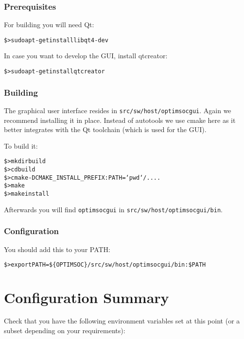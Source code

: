 \subsubsection{Prerequisites}

For building you will need Qt:

\begin{alltt}
\$> sudo apt-get install libqt4-dev
\end{alltt}

In case you want to develop the GUI, install qtcreator:

\begin{alltt}
\$> sudo apt-get install qtcreator
\end{alltt}

\subsubsection{Building}

The graphical user interface resides in
\verb|src/sw/host/optimsocgui|. Again we recommend installing it in
place. Instead of autotools we use cmake here as it better integrates
with the Qt toolchain (which is used for the GUI).

To build it:

\begin{alltt}
\$> mkdir build
\$> cd build
\$> cmake -DCMAKE_INSTALL_PREFIX:PATH=`pwd`/.. ..
\$> make
\$> make install
\end{alltt}

Afterwards you will find \verb|optimsocgui| in
\verb|src/sw/host/optimsocgui/bin|.

\subsubsection{Configuration}
You should add this to your PATH:

\begin{alltt}
\$> export PATH=\$\{OPTIMSOC\}/src/sw/host/optimsocgui/bin:\$PATH
\end{alltt}

\section{Configuration Summary}

Check that you have the following environment variables set at this
point (or a subset depending on your requirements):

